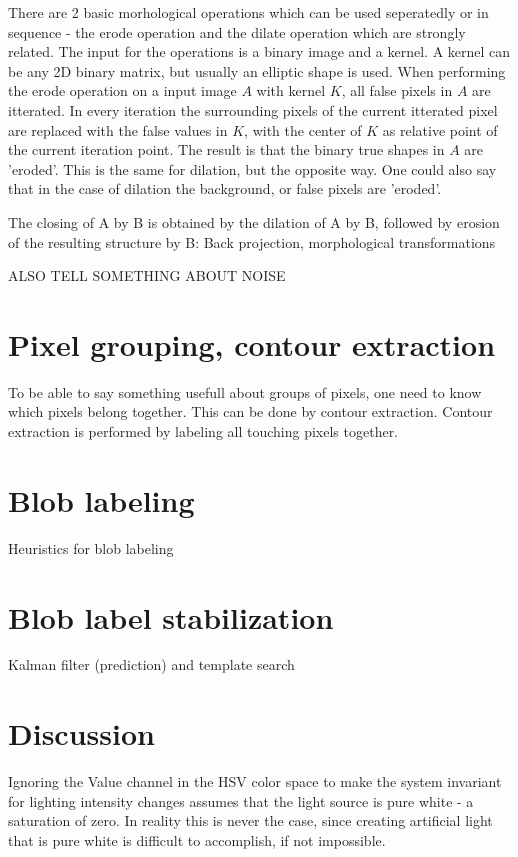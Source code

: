 There are 2 basic morhological operations which can be used seperatedly or in sequence - the erode operation and the dilate operation which are strongly related. The input for the operations is a binary image and a kernel. A kernel can be any 2D binary matrix, but usually an elliptic shape is used. When performing the erode operation on a input image $A$ with kernel $K$, all false pixels in $A$ are itterated. In every iteration the surrounding pixels of the current itterated pixel are replaced with the false values in $K$, with the center of $K$ as relative point of the current iteration point. The result is that the binary true shapes in $A$ are 'eroded'. This is the same for dilation, but the opposite way. One could also say that in the case of dilation the background, or false pixels are 'eroded'. 

The closing of A by B is obtained by the dilation of A by B, followed by erosion of the resulting structure by B:
Back projection, morphological transformations

ALSO TELL SOMETHING ABOUT NOISE 

\section{Pixel grouping, contour extraction}
To be able to say something usefull about groups of pixels, one need to know which pixels belong together. This can be done by contour extraction. Contour extraction is performed by labeling all touching pixels together.

\section{Blob labeling}
Heuristics for blob labeling

\section{Blob label stabilization}
Kalman filter (prediction) and template search

\section{Discussion}
Ignoring the Value channel in the HSV color space to make the system invariant for lighting intensity changes assumes that the light source is pure white - a saturation of zero. In reality this is never the case, since creating artificial light that is pure white is difficult to accomplish, if not impossible.

